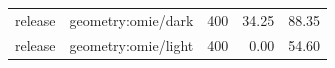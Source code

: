 \begin{longtable}{l>{\raggedright\arraybackslash}p{.42\linewidth}rrr}
release & %
geometry:omie/dark & %
400 & %
34.25 & %
88.35 \\ %

release & %
geometry:omie/light & %
400 & %
0.00 & %
54.60 \\ %


\end{longtable}
